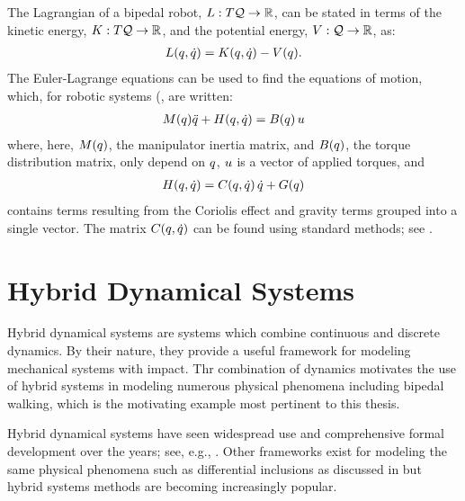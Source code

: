 The Lagrangian of a bipedal robot, $L : T\mathcal{Q} \to \mathbb{R}$, can be stated in terms of the kinetic energy, $K : T\mathcal{Q} \to \mathbb{R}$, and the potential energy, $V : \mathcal{Q} \to \mathbb{R}$, as:
%
\begin{align}
  L(q, \dot{q}) = K(q, \dot{q}) - V(q).
\end{align}
%
The Euler-Lagrange equations can be used to find the equations of motion, which, for robotic systems (\cite{MLS94}, are written:
%
\begin{align}
  \label{eqn:eom}
  M(q)\ddot{q} + H(q, \dot{q}) = B(q) \, u
\end{align}
%
where, here, $M(q)$, the manipulator inertia matrix, and $B(q)$, the torque distribution matrix, only depend on $q$, $u$ is a vector of applied torques, and
\begin{align}
  H(q, \dot{q}) = C(q, \dot{q}) \, \dot{q} + G(q)
\end{align}
contains terms resulting from the Coriolis effect and gravity terms grouped into a single vector. The matrix $C(q, \dot{q})$ can be found using standard methods; see \cite{MLS94}.

\section{Hybrid Dynamical Systems}

Hybrid dynamical systems are systems which combine continuous and discrete dynamics.
%
By their nature, they provide a useful framework for modeling mechanical systems with impact.
%
Thr combination of dynamics motivates the use of hybrid systems in modeling numerous physical phenomena including bipedal walking, which is the motivating example most pertinent to this thesis.
%

Hybrid dynamical systems have seen widespread use and comprehensive formal development over the years; see, e.g., \cite{BrBoMi98,GoSaTe09,aut_2014_gcsa_01,ScSc00,WGCCM07}.
%
Other frameworks exist for modeling the same physical phenomena such as differential inclusions as discussed in \cite{Filippov88} but hybrid systems methods are becoming increasingly popular.

